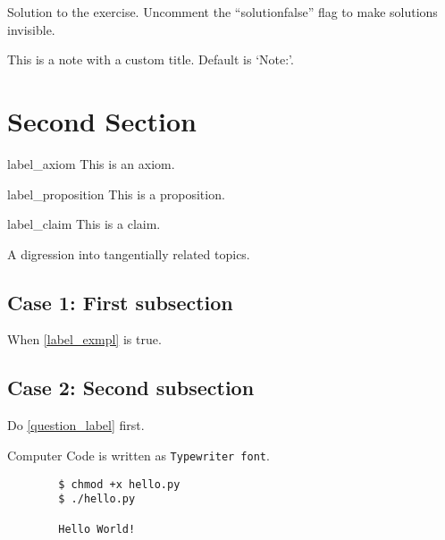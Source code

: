 \begin{solution}
	Solution to the exercise. Uncomment the ``solutionfalse'' flag to make solutions invisible.
\end{solution}


\begin{note}
	This is a note with a custom title. Default is `Note:'.
\end{note}



\section{Second Section}

\begin{axiom}{label_axiom}
	This is an axiom.
\end{axiom}

\begin{prop}{label_proposition}
	This is a proposition.
\end{prop}

\begin{claim}{label_claim}
	This is a claim.
\end{claim}

\begin{digression}
	A digression into tangentially related topics.
\end{digression}



\subsection{Case 1: First subsection}
When  \cref{label_exmpl} is true.
\begin{warning}[A Warning:] %
	\lipsum[1][1-2]
\end{warning}

\subsection{Case 2: Second subsection}
Do \cref{question_label} first.

Computer Code is written as {\tt Typewriter font}.

\begin{code}[Code:]
	\begin{verbatim}
		$ chmod +x hello.py
		$ ./hello.py
		
		Hello World!
	\end{verbatim}
\end{code}
